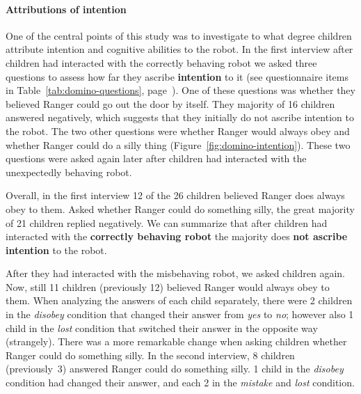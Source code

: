 \documentclass{sig-alternate}
\begin{document}
\paragraph{Attributions of intention}

One of the central points of this study was to investigate to what degree
children attribute intention and cognitive abilities to the robot.  In the first
interview after children had interacted with the correctly behaving robot we
asked three questions to assess how far they ascribe \textbf{intention} to it
(see questionnaire items in Table~\ref{tab:domino-questions},
page~\pageref{tab:domino-questions}). One of these questions was whether they
believed Ranger could go out the door by itself. They majority of 16 children
answered negatively, which suggests that they initially do not ascribe intention
to the robot. The two other questions were whether Ranger would always obey and
whether Ranger could do a silly thing (Figure~\ref{fig:domino-intention}). These
two questions were asked again later after children had interacted with the
unexpectedly behaving robot.


Overall, in the first interview 12 of the 26 children believed Ranger does
always obey to them. Asked whether Ranger could do something silly, the great
majority of 21 children replied negatively. We can summarize that after children
had interacted with the \textbf{correctly behaving robot} the majority does
\textbf{not ascribe intention} to the robot.

After they had interacted with the misbehaving robot, we asked children again.
Now, still 11 children (previously 12) believed Ranger would always obey to
them. When analyzing the answers of each child separately, there were 2 children
in the \textit{disobey} condition that changed their answer from \textit{yes} to
\textit{no}; however also 1 child in the \textit{lost} condition that switched
their answer in the opposite way (strangely). There was a more remarkable change
when asking children whether Ranger could do something silly. In the second
interview, 8 children (previously~3) answered Ranger could do something silly. 1
child in the \textit{disobey} condition had changed their answer, and each 2 in
the \textit{mistake} and \textit{lost} condition. 
\end{document}
